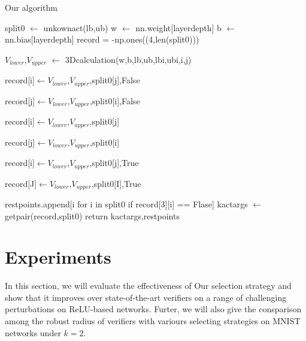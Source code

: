 \documentclass[runningheads]{llncs}
\begin{document}
\begin{algorithm}\label{algorithm1}  %
	\caption{Our algorithm}%
	\LinesNumbered %
	split0 $\leftarrow $ unkownact(lb,ub)\; %
	w $\leftarrow $ nn.weight[layerdepth]\;
	b $\leftarrow $ nn.bias[layerdepth]\;
	record = -np.ones((4,len(split0)))\;
	{
		{
			$V_{lower}$,$V_{upper}$ $\leftarrow $ 3Dcalculation(w,b,lb,ub,lbi,ubi,i,j)\;
		
			{
				{
					record[i]$\leftarrow V_{lower}$,$V_{upper}$,split0[j],False
				}
			}
			
			{
				{
					record[j]$\leftarrow V_{lower}$,$V_{upper}$,split0[i],False
				}
			}

			{
				record[i]$\leftarrow V_{lower}$,$V_{upper}$,split0[j]
			}

			{
				record[j]$\leftarrow V_{lower}$,$V_{upper}$,split0[i]
			}
			
			{
				record[i]$\leftarrow V_{lower}$,$V_{upper}$,split0[j],True
			}

			{
				record[J]$\leftarrow V_{lower}$,$V_{upper}$,split0[I],True
			}
			
		}

	}
	restpoints.append[i for i in split0 if record[3][i] == Flase]\;
	kactargs $\leftarrow$getpair(record,split0)\;
	return kactargs,restpoints\;
\end{algorithm}
\section{Experiments}
In this section, we will evaluate the effectiveness of Our selection strategy and show that it improves over state-of-the-art verifiers on a range of challenging perturbations on ReLU-based networks. Furter, we will also give the consparison among the robust radius of verifiers with variours selecting strategies on MNIST networks under $k=2$.
\end{document}
